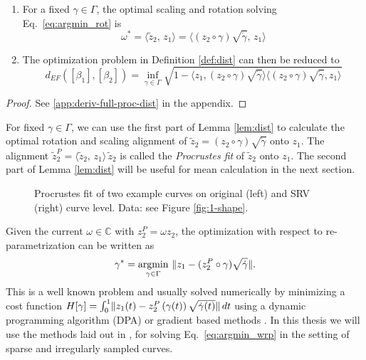 \begin{lemma}
  \label{lem:dist}
  \begin{enumerate}[label=\emph{\roman*.)}]
    \item For a fixed $\gamma \in \Gamma$, the optimal scaling and rotation solving Eq.\ \ref{eq:argmin_rot} is 
      $$ \omega^* = \langle \widetilde z_2,\, z_1 \rangle = \langle (z_2 \circ \gamma) \sqrt{\dot\gamma},\, z_1 \rangle$$
    \item The optimization problem in Definition \ref{def:dist} can then be reduced to
      $$ d_{EF}([\beta_1],[\beta_2]) = \inf_{\gamma \in \Gamma} \sqrt{ 1 - \langle z_1, (z_2 \circ \gamma) \sqrt{\dot\gamma} \rangle \langle (z_2 \circ \gamma) \sqrt{\dot\gamma}, z_1 \rangle }$$
  \end{enumerate}
  \begin{proof}
  See \ref{app:deriv-full-proc-dist} in the appendix.
  \end{proof}
\end{lemma}
\begin{remark}
  For fixed $\gamma \in \Gamma$, we can use the first part of Lemma \ref{lem:dist} to calculate the optimal rotation and scaling alignment of $\widetilde z_2 = (z_2 \circ \gamma) \sqrt{\dot\gamma}$ onto $z_1$. The alignment $\widetilde z_2^P = \langle \widetilde z_2,\, z_1 \rangle \, \widetilde z_2$ is called the \emph{Procrustes fit} of $\widetilde z_2$ onto $z_1$. The second part of Lemma \ref{lem:dist} will be useful for mean calculation in the next section.
\end{remark}

\begin{figure}
  \centering
  \begin{subfigure}{.48\textwidth}
    \centering
  \end{subfigure}\hfill%
  \begin{subfigure}{.48\textwidth}
    \centering
  \end{subfigure}
  \caption{Procrustes fit of two example curves on original (left) and SRV (right) curve level. Data: see Figure \ref{fig:1-shape}.}
  \label{fig:2-pfit}
\end{figure}

Given the current $\omega \in \mathbb{C}$ with $z_2^P = \omega z_2$, the optimization with respect to re-parametrization can be written as
\begin{equation}
  \label{eq:argmin_wrp}
  \gamma^* = \operatorname*{argmin}_{\gamma \in \Gamma}\,\, \lVert z_1 - (z_2^P \circ \gamma) \sqrt{\dot\gamma}\rVert.
\end{equation}
This is a well known problem and usually solved numerically by minimizing a cost function $H[\gamma] = \int_0^1 \lVert z_1(t) - z_2^P\left( \gamma(t) \right) \sqrt{\dot\gamma(t)}\rVert\, dt$ using a dynamic programming algorithm (DPA) or gradient based methods \parencite[see][]{SrivastavaEtAl2011}.
In this thesis we will use the methods laid out in \cite{Steyer2021}, for solving Eq.\ \ref{eq:argmin_wrp} in the setting of sparse and irregularly sampled curves.

